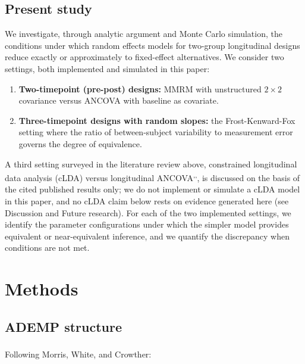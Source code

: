 \documentclass[
  11pt,
]{article}
\providecommand{\tightlist}{%
  \setlength{\itemsep}{0pt}\setlength{\parskip}{0pt}}
\begin{document}
\subsection{Present study}\label{present-study}

We investigate, through analytic argument and Monte
Carlo simulation, the conditions under which random
effects models for two-group longitudinal designs
reduce exactly or approximately to fixed-effect
alternatives. We consider two settings, both
implemented and simulated in this paper:

\begin{enumerate}
\def\labelenumi{\arabic{enumi}.}
\tightlist
\item
  \textbf{Two-timepoint (pre-post) designs:} MMRM with
  unstructured \(2 \times 2\) covariance versus ANCOVA
  with baseline as covariate.
\item
  \textbf{Three-timepoint designs with random slopes:}
  the Frost-Kenward-Fox setting where the ratio of
  between-subject variability to measurement error
  governs the degree of equivalence.
\end{enumerate}

A third setting surveyed in the literature review
above, constrained longitudinal data analysis (cLDA)
versus longitudinal ANCOVA\textsuperscript{,,}, is discussed on
the basis of the cited published results only; we do
not implement or simulate a cLDA model in this paper,
and no cLDA claim below rests on evidence generated
here (see Discussion and Future research). For each of
the two implemented settings, we identify the
parameter configurations under which the simpler model
provides equivalent or near-equivalent inference, and
we quantify the discrepancy when conditions are not
met.

\FloatBarrier

\section{Methods}\label{methods}

\subsection{ADEMP structure}\label{ademp-structure}

Following Morris, White, and Crowther\textsuperscript{}:
\end{document}
